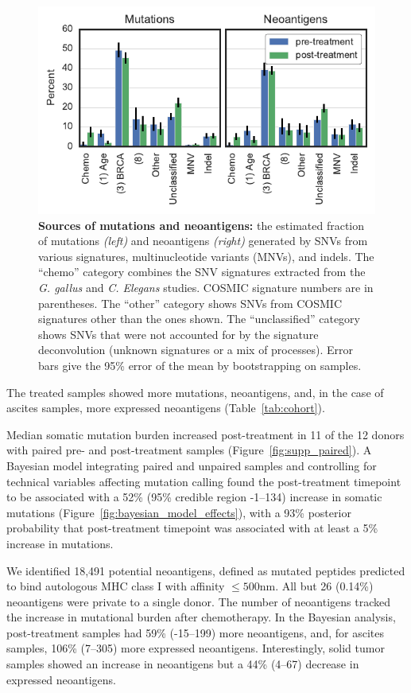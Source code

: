 \begin{figure}[htbp]
\centering
\includegraphics[scale=1.0]{figures/sources_of_mutations_and_neoantigens.pdf}
\caption{\textbf{Sources of mutations and neoantigens:} the estimated fraction of mutations \textit{(left)} and neoantigens \textit{(right)} generated by SNVs from various signatures, multinucleotide variants (MNVs), and indels. The ``chemo'' category combines the SNV signatures extracted from the \textit{G. gallus} and \textit{C. Elegans} studies. COSMIC signature numbers are in parentheses. The ``other'' category shows SNVs from COSMIC signatures other than the ones shown. The ``unclassified'' category shows SNVs that were not accounted for by the signature deconvolution (unknown signatures or a mix of processes). Error bars give the 95\% error of the mean by bootstrapping on samples.}
\label{fig:sources}
\end{figure}

The treated samples showed more mutations, neoantigens, and, in the case of ascites samples, more expressed neoantigens (Table~\ref{tab:cohort}).

Median somatic mutation burden increased post-treatment in 11 of the 12 donors with paired pre- and post-treatment samples (Figure~\ref{fig:supp_paired}). A Bayesian model integrating paired and unpaired samples and controlling for technical variables affecting mutation calling found the post-treatment timepoint to be associated with a 52\% (95\% credible region -1--134) increase in somatic mutations (Figure~\ref{fig:bayesian_model_effects}), with a 93\% posterior probability that post-treatment timepoint was associated with at least a 5\% increase in mutations.

We identified 18,491 potential neoantigens, defined as mutated peptides predicted to bind autologous MHC class I with affinity $\leq 500$nm. All but 26 (0.14\%) neoantigens were private to a single donor. The number of neoantigens tracked the increase in mutational burden after chemotherapy. In the Bayesian analysis, post-treatment samples had 59\% (-15--199) more neoantigens, and, for ascites samples, 106\% (7--305) more expressed neoantigens. Interestingly, solid tumor samples showed an increase in neoantigens but a 44\% (4--67) decrease in expressed neoantigens.

